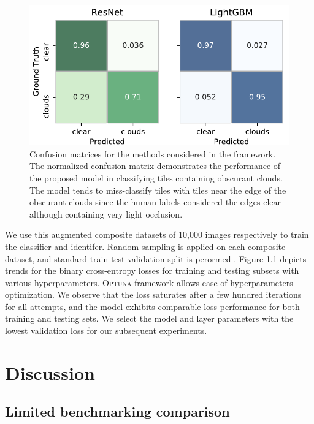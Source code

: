 \documentclass[amt, article]{copernicus}
\begin{document}
\begin{figure}[t]
	\includegraphics[width=\hsize]{figures/confusion_matrices.png}
	\caption{ Confusion matrices for the methods considered in the framework. The normalized confusion matrix demonstrates the performance of the proposed model in classifying tiles containing obscurant clouds. The model tends to miss-classify tiles with tiles near the edge of the obscurant clouds since the human labels considered the edges clear although containing very light occlusion.}
    \label{fig:confusion_matrices}
\end{figure}

We use this augmented composite datasets of 10,000 images respectively to train the classifier and identifer. Random sampling is applied on each composite dataset, and standard train-test-validation split is perormed . Figure \ref{} depicts trends for the binary cross-entropy losses for training and testing subsets with various hyperparameters. \textsc{Optuna} framework allows ease of hyperparameters optimization. We observe that the loss saturates after a few hundred iterations for all attempts, and the model exhibits comparable loss performance for both training and testing sets. We select the model and layer parameters with the lowest validation loss for our subsequent experiments.



\section{Discussion}
\label{sec:discussion}

\subsection{Limited benchmarking comparison}
\end{document}
